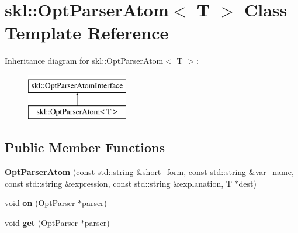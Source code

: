 \hypertarget{classskl_1_1_opt_parser_atom}{}\section{skl\+:\+:Opt\+Parser\+Atom$<$ T $>$ Class Template Reference}
\label{classskl_1_1_opt_parser_atom}
Inheritance diagram for skl\+:\+:Opt\+Parser\+Atom$<$ T $>$\+:\begin{figure}[H]
\begin{center}
\leavevmode
\includegraphics[height=2.000000cm]{classskl_1_1_opt_parser_atom}
\end{center}
\end{figure}
\subsection*{Public Member Functions}
\begin{DoxyCompactItemize}
\item 
\hypertarget{classskl_1_1_opt_parser_atom_a8a7f6fb8e4ffdcbc7bb3e8d38e1ca98d}{}\label{classskl_1_1_opt_parser_atom_a8a7f6fb8e4ffdcbc7bb3e8d38e1ca98d} 
{\bfseries Opt\+Parser\+Atom} (const std\+::string \&short\+\_\+form, const std\+::string \&var\+\_\+name, const std\+::string \&expression, const std\+::string \&explanation, T $\ast$dest)
\item 
\hypertarget{classskl_1_1_opt_parser_atom_acdf3f38281c75daf8fd5828f94746747}{}\label{classskl_1_1_opt_parser_atom_acdf3f38281c75daf8fd5828f94746747} 
void {\bfseries on} (\hyperlink{classskl_1_1_opt_parser}{Opt\+Parser} $\ast$parser)
\item 
\hypertarget{classskl_1_1_opt_parser_atom_a06ad48ea0c67af986c4fb906c2f58c77}{}\label{classskl_1_1_opt_parser_atom_a06ad48ea0c67af986c4fb906c2f58c77} 
void {\bfseries get} (\hyperlink{classskl_1_1_opt_parser}{Opt\+Parser} $\ast$parser)
\end{DoxyCompactItemize}
